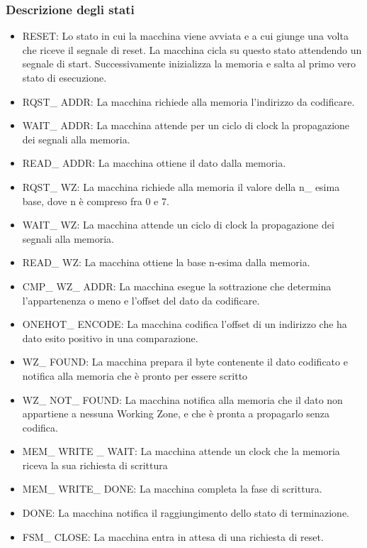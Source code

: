 \documentclass{article}
\begin{document}
\subsubsection{Descrizione degli stati}

\begin{itemize}

\item RESET: Lo stato in cui la macchina viene avviata e a cui giunge una volta che riceve il segnale di reset. La macchina cicla su questo stato attendendo un segnale di start. Successivamente inizializza la memoria e salta al primo vero stato di esecuzione.

\item RQST\_ ADDR: La macchina richiede alla memoria l'indirizzo da codificare.

\item WAIT\_ ADDR: La macchina attende per un ciclo di clock la propagazione dei segnali alla memoria.

\item READ\_ ADDR: La macchina ottiene il dato dalla memoria.

\item RQST\_ WZ: La macchina richiede alla memoria il valore della n\_ esima base, dove n è compreso fra 0 e 7.

\item WAIT\_ WZ: La macchina attende un ciclo di clock la propagazione dei segnali alla memoria.

\item READ\_ WZ: La macchina ottiene la base n-esima dalla memoria.

\item CMP\_ WZ\_ ADDR: La macchina esegue la sottrazione che determina l'appartenenza o meno e l'offset del dato da codificare.

\item ONEHOT\_ ENCODE: La macchina codifica l'offset di un indirizzo che ha dato esito positivo in una comparazione.

\item WZ\_ FOUND: La macchina prepara il byte contenente il dato codificato e notifica alla memoria che è pronto per essere scritto

\item WZ\_ NOT\_ FOUND: La macchina notifica alla memoria che il dato non appartiene a nessuna Working Zone, e che è pronta a propagarlo senza codifica.

\item MEM\_ WRITE \_ WAIT: La macchina attende un clock che la memoria riceva la sua richiesta di scrittura

\item MEM\_ WRITE\_ DONE: La macchina completa la fase di scrittura.

\item DONE: La macchina notifica il raggiungimento dello stato di terminazione.

\item FSM\_ CLOSE: La macchina entra in attesa di una richiesta di reset.

\end{itemize}
\end{document}
